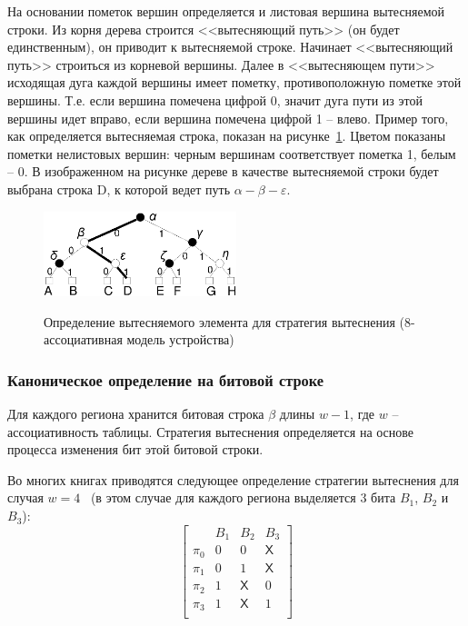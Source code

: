 На основании пометок вершин определяется и листовая вершина вытесняемой строки.
Из корня дерева строится <<вытесняющий путь>> (он будет единственным), он приводит к вытесняемой строке. Начинает <<вытесняющий путь>> строиться из корневой вершины. Далее в <<вытесняющем пути>> исходящая дуга каждой вершины имеет пометку, противоположную пометке этой вершины. Т.е. если вершина помечена цифрой 0, значит дуга пути из этой вершины идет вправо, если вершина помечена цифрой 1 -- влево. Пример того, как определяется вытесняемая строка, показан на рисунке~\ref{pseudo_lru_miss}. Цветом показаны пометки нелистовых вершин: черным
вершинам соответствует пометка 1, белым -- 0. В изображенном на рисунке дереве в качестве вытесняемой строки будет выбрана строка D, к которой ведет путь $\alpha-\beta-\varepsilon$.

\begin{figure}[h] \center
  \includegraphics[width=0.5\textwidth]{2.theor/plrumiss}\\
  \caption{Определение вытесняемого элемента для стратегия вытеснения
  \PseudoLRU (8-ассоциативная модель устройства)}\label{pseudo_lru_miss}
\end{figure}


\subsubsection{Каноническое определение \PseudoLRU на битовой строке}

Для каждого региона хранится битовая строка $\beta$ длины $w{-}1$, где $w$ -- ассоциативность таблицы. Стратегия вытеснения определяется на основе процесса изменения бит этой битовой строки.

Во многих книгах приводятся следующее определение стратегии вытеснения \PseudoLRU для случая
$w=4$~\cite{FundamentalOfComputerOrganizationAndDesign} (в этом случае для каждого региона выделяется 3 бита $B_1$, $B_2$ и $B_3$):
$$ \left[
  \begin{array}{c|ccc}
          & B_1 & B_2 & B_3 \\ \hline
    \pi_0 & 0 & 0 & \textsf{X} \\
    \pi_1 & 0 & 1 & \textsf{X} \\
    \pi_2 & 1 & \textsf{X} & 0 \\
    \pi_3 & 1 & \textsf{X} & 1 \\
  \end{array}
\right]
$$

